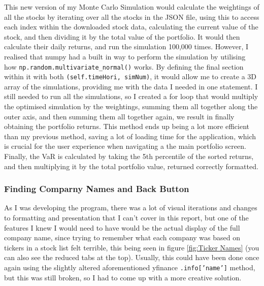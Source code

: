 \documentclass{article}
\begin{document}
\vspace{0.3cm}
This new version of my Monte Carlo Simulation would calculate the weightings of all the stocks by iterating over all the stocks in the JSON file, using this to access each index within the downloaded stock data, calculating the current value of the stock, and then dividing it by the total value of the portfolio. It would then calculate their daily returns, and run the simulation 100,000 times. However, I realised that numpy had a built in way to perform the simulation by utilising how \texttt{np.random.multivariate\_normal()} works. By defining the final section within it with both \texttt{(self.timeHori, simNum)}, it would allow me to create a 3D array of the simulations, providing me with the data I needed in one statement. I still needed to run all the simulations, so I created a for loop that would multiply the optimised simulation by the weightings, summing them all together along the outer axis, and then summing them all together again, we result in finally obtaining the portfolio returns. This method ends up being a lot more efficient than my previous method, saving a lot of loading time for the application, which is crucial for the user experience when navigating a the main portfolio screen. Finally, the VaR is calculated by taking the 5th percentile of the sorted returns, and then multiplying it by the total portfolio value, returned correctly formatted.\\\vspace{0.3cm}

\subsubsection{Finding Comparny Names and Back Button}
As I was developing the program, there was a lot of visual iterations and changes to formatting and presentation that I can't cover in this report, but one of the features I knew I would need to have would be the actual display of the full company name, since trying to remember what each company was based on tickers in a stock list felt terrible, this being seen in figure \ref{fig:Ticker Names} (you can also see the reduced tabs at the top). Usually, this could have been done once again using the slightly altered aforementioned yfinance \texttt{.info['name']} method, but this was still broken, so I had to come up with a more creative solution.\\\vspace{0.3cm}
\end{document}
